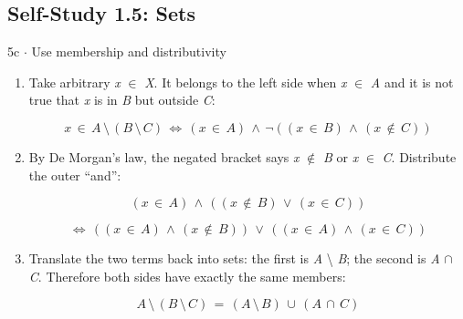 \documentclass[11pt]{article}
\begin{document}
\begin{keepsection}\subsection{Self-Study 1.5: Sets}

\begin{workedbox}{5c \ensuremath{\cdot} Use membership and distributivity}
\begin{enumerate}
\item {}
Take arbitrary \textit{x} \ensuremath{\in} \textit{X}. It belongs to the left side when \textit{x} \ensuremath{\in} \textit{A} and it is not true that \textit{x} is in \textit{B} but outside \textit{C}:

\begin{equation*}{x}\, \in \, {A}\, \setminus \, ({B}\, \setminus \, {C})\, \Leftrightarrow \, ({x}\, \in \, {A})\, \land \, \neg (({x}\, \in \, {B})\, \land \, ({x}\, \notin \, {C}))\end{equation*}
\item {}
By De Morgan’s law, the negated bracket says \textit{x} \ensuremath{\notin} \textit{B} or \textit{x} \ensuremath{\in} \textit{C}. Distribute the outer “and”:

\begin{equation*}({x}\, \in \, {A})\, \land \, (({x}\, \notin \, {B})\, \lor \, ({x}\, \in \, {C}))\end{equation*}

\begin{equation*}\Leftrightarrow \, (({x}\, \in \, {A})\, \land \, ({x}\, \notin \, {B}))\, \lor \, (({x}\, \in \, {A})\, \land \, ({x}\, \in \, {C}))\end{equation*}
\item {}
Translate the two terms back into sets: the first is \textit{A} \textbackslash{} \textit{B}; the second is \textit{A} \ensuremath{\cap} \textit{C}. Therefore both sides have exactly the same members:

\begin{equation*}{A}\, \setminus \, ({B}\, \setminus \, {C})\, =\, ({A}\, \setminus \, {B})\, \cup \, ({A}\, \cap \, {C})\end{equation*}
\end{enumerate}
\end{workedbox}

\end{keepsection}
\end{document}

